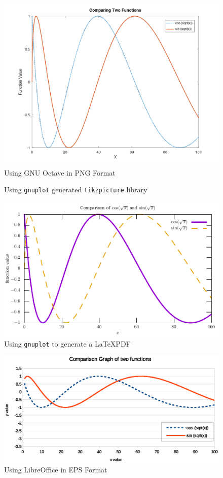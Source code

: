 \begin{figure}[H]
  \centering 
  \includegraphics[width=0.75\columnwidth]{figures/OctavePNG.png}
  \caption {Using GNU Octave in PNG Format}
\end{figure}

\begin{figure}[H]
  \centering 
  \caption {Using \texttt{gnuplot} generated \texttt{tikzpicture} library}
\end{figure}

\begin{figure}[H]
  \centering 
  \includegraphics[width=0.75\columnwidth]{figures/GnuPlotPDF.pdf}
  \caption {Using \texttt{gnuplot} to generate a \LaTeX PDF}
\end{figure}

\begin{figure}[H]
  \centering 
  \includegraphics[width=0.75\columnwidth]{figures/LibreEPS.eps}
  \caption {Using LibreOffice in EPS Format}
\end{figure}


